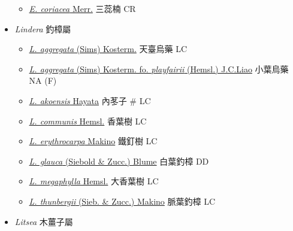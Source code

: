 \begin{itemize}
  \begin{itemize}
        \item[] \href{http://www.theplantlist.org/tpl1.1/search?q=Endiandra+coriacea}{\textit{E. coriacea} Merr.}   三蕊楠   CR
  \end{itemize}
 \item[] \textit{Lindera} 釣樟屬
                                
  \begin{itemize}
        \item[] \href{http://www.theplantlist.org/tpl1.1/search?q=Lindera+aggregata}{\textit{L. aggregata} (Sims) Kosterm.}   天臺烏藥   LC
        \item[] \href{http://www.theplantlist.org/tpl1.1/search?q=Lindera+aggregata}{\textit{L. aggregata} (Sims) Kosterm. fo. \textit{playfairii} (Hemsl.) J.C.Liao}   小葉烏藥   NA (F)
        \item[] \href{http://www.theplantlist.org/tpl1.1/search?q=Lindera+akoensis}{\textit{L. akoensis} Hayata}   內苳子  \# LC
        \item[] \href{http://www.theplantlist.org/tpl1.1/search?q=Lindera+communis}{\textit{L. communis} Hemsl.}   香葉樹   LC
        \item[] \href{http://www.theplantlist.org/tpl1.1/search?q=Lindera+erythrocarpa}{\textit{L. erythrocarpa} Makino}   鐵釘樹   LC
        \item[] \href{http://www.theplantlist.org/tpl1.1/search?q=Lindera+glauca}{\textit{L. glauca} (Siebold \& Zucc.) Blume}   白葉釣樟   DD
        \item[] \href{http://www.theplantlist.org/tpl1.1/search?q=Lindera+megaphylla}{\textit{L. megaphylla} Hemsl.}   大香葉樹   LC
        \item[] \href{http://www.theplantlist.org/tpl1.1/search?q=Lindera+thunbergii}{\textit{L. thunbergii} (Sieb. \& Zucc.) Makino}   脈葉釣樟   LC
  \end{itemize}
 \item[] \textit{Litsea} 木薑子屬
                                

\end{itemize}
